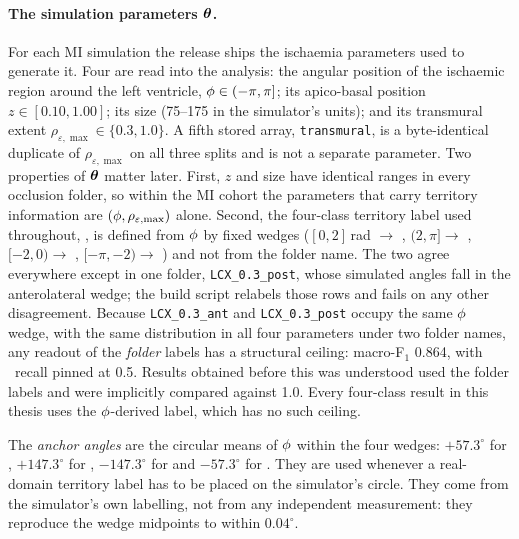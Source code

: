 \paragraph{The simulation parameters $\boldsymbol{\theta}$.}
\label{sec:theta}
For each MI simulation the release ships the ischaemia parameters used to generate it. Four are read into the analysis: the angular position of the ischaemic region around the left ventricle, $\phi \in (-\pi, \pi]$; its apico-basal position $z \in [0.10, 1.00]$; its size (75--175 in the simulator's units); and its transmural extent $\rho_{\varepsilon,\max} \in \{0.3, 1.0\}$. A fifth stored array, \texttt{transmural}, is a byte-identical duplicate of $\rho_{\varepsilon,\max}$ on all three splits and is not a separate parameter.  Two properties of $\boldsymbol{\theta}$ matter later. First, $z$ and size have identical ranges in every occlusion folder, so within the MI cohort the parameters that carry territory information are $(\phi, \rho_{\varepsilon,\max})$ alone. Second, the four-class territory label used throughout, \territory, is defined from $\phi$ by fixed wedges ($[0, 2]$\,rad $\to$ \AS, $(2, \pi] \to$ \AL, $[-2, 0) \to$ \INF, $[-\pi, -2) \to$ \IL) and not from the folder name. The two agree everywhere except in one folder, \texttt{LCX\_0.3\_post}, whose simulated angles fall in the anterolateral wedge; the build script relabels those rows and fails on any other disagreement.  Because \texttt{LCX\_0.3\_ant} and \texttt{LCX\_0.3\_post} occupy the same $\phi$ wedge, with the same distribution in all four parameters under two folder names, any readout of the \emph{folder} labels has a structural ceiling: macro-F$_1$ 0.864, with \IL\ recall pinned at 0.5. Results obtained before this was understood used the folder labels and were implicitly compared against 1.0. Every four-class result in this thesis uses the $\phi$-derived label, which has no such ceiling. 

The \emph{anchor angles} are the circular means of $\phi$ within the four wedges: $+57.3^\circ$ for \AS, $+147.3^\circ$ for \AL, $-147.3^\circ$ for \IL and $-57.3^\circ$ for \INF. They are used whenever a real-domain territory label has to be placed on the simulator's circle. They come from the simulator's own labelling, not from any independent measurement: they reproduce the wedge midpoints to within $0.04^\circ$. 

